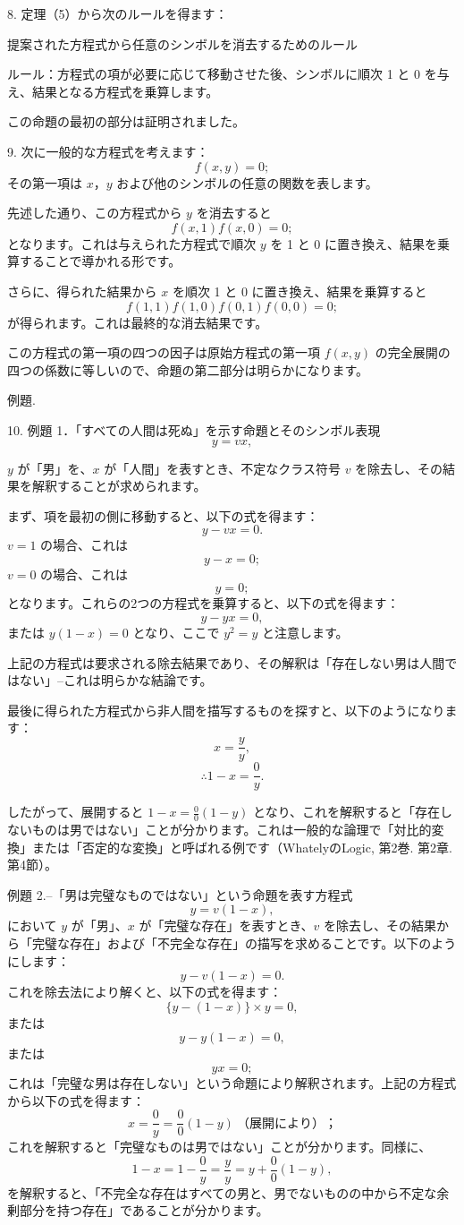 \documentclass[a4paper,11pt,openany]{ltjsbook}
\begin{document}
8. 定理（5）から次のルールを得ます：

提案された方程式から任意のシンボルを消去するためのルール

ルール：方程式の項が必要に応じて移動させた後、シンボルに順次 1 と 0 を与え、結果となる方程式を乗算します。

この命題の最初の部分は証明されました。

9. 次に一般的な方程式を考えます：
\[
     f(x,y) = 0;
\]
その第一項は $x$，$y$ および他のシンボルの任意の関数を表します。

先述した通り、この方程式から $y$ を消去すると
\[
     f(x,1)f(x,0) = 0;
\]
となります。これは与えられた方程式で順次 $y$ を 1 と 0 に置き換え、結果を乗算することで導かれる形です。

さらに、得られた結果から $x$ を順次 1 と 0 に置き換え、結果を乗算すると
\[
     f(1,1)f(1,0)f(0,1)f(0,0) = 0;
\]
が得られます。これは最終的な消去結果です。

この方程式の第一項の四つの因子は原始方程式の第一項 $f(x,y)$ の完全展開の四つの係数に等しいので、命題の第二部分は明らかになります。

\begin{center}
\textsc{例題}.
\end{center}

10. 例題 1．「すべての人間は死ぬ」を示す命題とそのシンボル表現
\[
     y = vx,
\]

$y$ が「男」を、$x$ が「人間」を表すとき、不定なクラス符号 $v$ を除去し、その結果を解釈することが求められます。

まず、項を最初の側に移動すると、以下の式を得ます：
\[
y - vx = 0.
\]
$v = 1$ の場合、これは
\[
y - x = 0;
\]
$v = 0$ の場合、これは
\[
y = 0;
\]
となります。これらの2つの方程式を乗算すると、以下の式を得ます：
\[
y - yx = 0,
\]
または $y(1 - x) = 0$ となり、ここで $y^2 = y$ と注意します。

上記の方程式は要求される除去結果であり、その解釈は「存在しない男は人間ではない」--これは明らかな結論です。

最後に得られた方程式から非人間を描写するものを探すと、以下のようになります：
\[
x = \frac{y}{y},
\]
\[
\therefore 1 - x = \frac{0}{y}.
\]

したがって、展開すると $1 - x = \frac{0}{0}(1 - y)$ となり、これを解釈すると「存在しないものは男ではない」ことが分かります。これは一般的な論理で「対比的変換」または「否定的な変換」と呼ばれる例です（WhatelyのLogic, 第2巻. 第2章. 第4節）。

例題 2.--「男は完璧なものではない」という命題を表す方程式
\[
y = v(1 - x),
\]
において $y$ が「男」、$x$ が「完璧な存在」を表すとき、$v$ を除去し、その結果から「完璧な存在」および「不完全な存在」の描写を求めることです。以下のようにします：
\[
y - v(1 - x) = 0.
\]
これを除去法により解くと、以下の式を得ます：
\[
\{y - (1 - x)\} \times y = 0,
\]
または
\[
y - y(1 - x) = 0,
\]
または
\[
yx = 0;
\]
これは「完璧な男は存在しない」という命題により解釈されます。上記の方程式から以下の式を得ます：
\[
x = \frac{0}{y} = \frac{0}{0}(1 - y)\:（展開により）；
\]
これを解釈すると「完璧なものは男ではない」ことが分かります。同様に、
\[
1 - x = 1 - \frac{0}{y} = \frac{y}{y} = y + \frac{0}{0}(1 - y),
\]
を解釈すると、「不完全な存在はすべての男と、男でないものの中から不定な余剰部分を持つ存在」であることが分かります。
\end{document}
